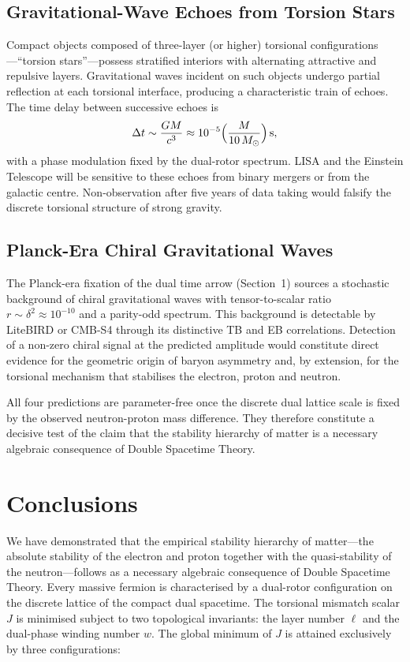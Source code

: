 \documentclass[a4paper]{article}
\begin{document}
\subsection{Gravitational-Wave Echoes from Torsion Stars}

Compact objects composed of three-layer (or higher) torsional configurations—``torsion stars''—possess stratified interiors with alternating attractive and repulsive layers. Gravitational waves incident on such objects undergo partial reflection at each torsional interface, producing a characteristic train of echoes. The time delay between successive echoes is
\[
\Delta t \sim \frac{GM}{c^3} \approx 10^{-5}\Bigl(\frac{M}{10\,M_\odot}\Bigr)\,\mathrm{s},
\]
with a phase modulation fixed by the dual-rotor spectrum. LISA and the Einstein Telescope will be sensitive to these echoes from binary mergers or from the galactic centre. Non-observation after five years of data taking would falsify the discrete torsional structure of strong gravity.

\subsection{Planck-Era Chiral Gravitational Waves}

The Planck-era fixation of the dual time arrow (Section~1) sources a stochastic background of chiral gravitational waves with tensor-to-scalar ratio \(r \sim \delta^2 \approx 10^{-10}\) and a parity-odd spectrum. This background is detectable by LiteBIRD or CMB-S4 through its distinctive TB and EB correlations. Detection of a non-zero chiral signal at the predicted amplitude would constitute direct evidence for the geometric origin of baryon asymmetry and, by extension, for the torsional mechanism that stabilises the electron, proton and neutron.

All four predictions are parameter-free once the discrete dual lattice scale is fixed by the observed neutron-proton mass difference. They therefore constitute a decisive test of the claim that the stability hierarchy of matter is a necessary algebraic consequence of Double Spacetime Theory.

\section{Conclusions}

We have demonstrated that the empirical stability hierarchy of matter—the absolute stability of the electron and proton together with the quasi-stability of the neutron—follows as a necessary algebraic consequence of Double Spacetime Theory. Every massive fermion is characterised by a dual-rotor configuration on the discrete lattice of the compact dual spacetime. The torsional mismatch scalar \(J\) is minimised subject to two topological invariants: the layer number \(\ell\) and the dual-phase winding number \(w\). The global minimum of \(J\) is attained exclusively by three configurations:
\end{document}
